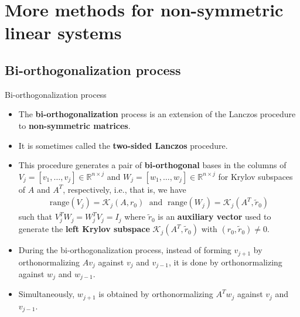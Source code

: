 \documentclass[t,usepdftitle=false]{beamer}
\begin{document}
\section{More methods for non-symmetric linear systems}

\subsection{Bi-orthogonalization process}
\begin{frame}{Bi-orthogonalization process}
\begin{itemize}
\item The \textbf{bi-orthogonalization} process is an extension of the Lanczos procedure to \textbf{non-symmetric matrices}.
\item[] It is sometimes called the \textbf{two-sided Lanczos} procedure.
\item This procedure generates a pair of \textbf{bi-orthogonal} bases in the columns of $V_j=[v_1,\dots,v_j]\in\mathbb{R}^{n\times j}$ and $W_j=[w_1,\dots,w_j]\in\mathbb{R}^{n\times j}$ for Krylov subspaces of $A$ and $A^T$, respectively, i.e., that is, we have
\begin{align*}
\text{range}(V_j)=\mathcal{K}_j(A,r_0)
\;\text{ and }\;
\text{range}(W_j)=\mathcal{K}_j(A^T,\tilde{r}_0)
\end{align*}
such that $V_j^TW_j=W_j^TV_j=I_j$ where $\tilde{r}_0$ is an \textbf{auxiliary vector} used to generate the \textbf{left Krylov subspace} $\mathcal{K}_j(A^T,\tilde{r}_0)$ with $(r_0,\tilde{r}_0)\neq 0$.
\item During the bi-orthogonalization process, instead of forming $v_{j+1}$ by orthonormalizing $Av_j$ against $v_j$ and $v_{j-1}$, it is done by orthonormalizing against $w_j$ and $w_{j-1}$.
\item[] Simultaneously, $w_{j+1}$ is obtained by orthonormalizing $A^Tw_j$ against $v_{j}$ and $v_{j-1}$.
\end{itemize}
\end{frame}
\end{document}
